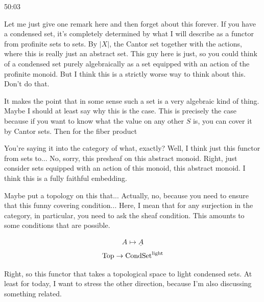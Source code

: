 \begin{unfinished}{50:03}

\begin{remark}
Let me just give one remark here and then forget about this forever. If you have a condensed set, it's completely determined by what I will describe as a functor from profinite sets to sets. By $|X|$, the Cantor set together with the actions, where this is really just an abstract set. This guy here is just, so you could think of a condensed set purely algebraically as a set equipped with an action of the profinite monoid. But I think this is a strictly worse way to think about this. Don't do that.

It makes the point that in some sense such a set is a very algebraic kind of thing. Maybe I should at least say why this is the case. This is precisely the case because if you want to know what the value on any other $S$ is, you can cover it by Cantor sets. Then for the fiber product

You're saying it into the category of what, exactly? Well, I think just this functor from sets to... No, sorry, this presheaf on this abstract monoid. Right, just consider sets equipped with an action of this monoid, this abstract monoid. I think this is a fully faithful embedding.

Maybe put a topology on this that... Actually, no, because you need to ensure that this funny covering condition... Here, I mean that for any surjection in the category, in particular, you need to ask the sheaf condition. This amounts to some conditions that are possible.

\end{remark}


\begin{proposition}
\begin{align*}
A \mapsto \underline{A}
\end{align*}
\begin{align*}
\mathrm{Top} \to \mathrm{Cond}\mathrm{Set}^{\mathrm{light}}
\end{align*}
\end{proposition}
Right, so this functor that takes a topological space to light condensed sets. At least for today, I want to stress the other direction, because I'm also discussing something related.


\end{unfinished}
